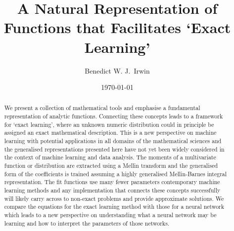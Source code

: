 \documentclass{article}
\title{A Natural Representation of Functions that Facilitates `Exact Learning'}
\date{\today}
\begin{document}
%


\author[1,2]{Benedict W. J.~Irwin}


\maketitle

\begin{abstract}
We present a collection of mathematical tools and emphasise a fundamental representation of analytic functions. Connecting these concepts leads to a framework for `exact learning', where an unknown numeric distribution could in principle be assigned an exact mathematical description. This is a new perspective on machine learning with potential applications in all domains of the mathematical sciences and the generalised representations presented here have not yet been widely considered in the context of machine learning and data analysis. The moments of a multivariate function or distribution are extracted using a Mellin transform and the generalised form of the coefficients is trained assuming a highly generalised Mellin-Barnes integral representation. The fit functions use many fewer parameters contemporary machine learning methods and any implementation that connects these concepts successfully will likely carry across to non-exact problems and provide approximate solutions. We compare the equations for the exact learning method with those for a neural network which leads to a new perspective on understanding what a neural network may be learning and how to interpret the parameters of those networks.
\end{abstract}

\end{document}
